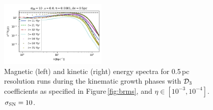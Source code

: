 \documentclass[iop,apj,numberedappendix,twocolappendix]{emulateapj}
\begin{document}
\begin{figure}
\includegraphics[trim=0.0cm 0.00cm 0.0cm 0.0cm,clip=true,width=0.45\textwidth]{csc_figs/05pcPm0e-4_0kpower.png}
\caption{
Magnetic (left) and kinetic (right) energy spectra for 0.5\,pc resolution runs 
during the kinematic growth phases with ${\cal D}_3$ 
coefficients as specified in Figure\,\ref{fig:brms}, and $\eta\in[10^{-3},10^{-4}]$. $\sigma_{\rm SN}=10$.
\label{fig:4spectraRm}
}
\end{figure}
\end{document}
